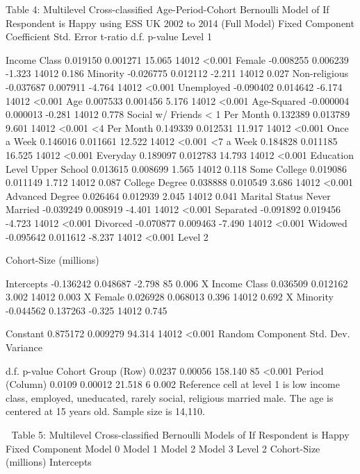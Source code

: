 

Table 4: Multilevel Cross-classified Age-Period-Cohort Bernoulli Model of If Respondent is Happy using ESS UK 2002 to 2014 (Full Model)
Fixed Component
Coefficient
Std. Error
t-ratio
d.f.
p-value
Level 1





Income Class
0.019150
0.001271
15.065
14012
<0.001
Female
-0.008255
0.006239
-1.323
14012
0.186
Minority
-0.026775
0.012112
-2.211
14012
0.027
Non-religious
-0.037687
0.007911
-4.764
14012
<0.001
Unemployed
-0.090402
0.014642
-6.174
14012
<0.001
Age
0.007533
0.001456
5.176
14012
<0.001
Age-Squared
-0.000004
0.000013
-0.281
14012
0.778
Social w/ Friends
< 1 Per Month
0.132389
0.013789
9.601
14012
<0.001
<4 Per Month
0.149339
0.012531
11.917
14012
<0.001
Once a Week
0.146016
0.011661
12.522
14012
<0.001
<7 a Week
0.184828
0.011185
16.525
14012
<0.001
Everyday
0.189097
0.012783
14.793
14012
<0.001
Education Level
Upper School
0.013615
0.008699
1.565
14012
0.118
Some College
0.019086
0.011149
1.712
14012
0.087
College Degree
0.038888
0.010549
3.686
14012
<0.001
Advanced Degree
0.026464
0.012939
2.045
14012
0.041
Marital Status
Never Married
-0.039249
0.008919
-4.401
14012
<0.001
Separated
-0.091892
0.019456
-4.723
14012
<0.001
Divorced
-0.070877
0.009463
-7.490
14012
<0.001
Widowed
-0.095642
0.011612
-8.237
14012
<0.001
Level 2





Cohort-Size (millions)





Intercepts
-0.136242
0.048687
-2.798
85
0.006
X Income Class
0.036509
0.012162
3.002
14012
0.003
X Female
0.026928
0.068013
0.396
14012
0.692
X Minority
-0.044562
0.137263
-0.325
14012
0.745






Constant
0.875172
0.009279
94.314
14012
<0.001
Random Component
Std. Dev.
Variance

d.f.
p-value
Cohort Group (Row)
0.0237
0.00056
158.140
85
<0.001
Period (Column)
0.0109
0.00012
21.518
6
0.002
Reference cell at level 1 is low income class, employed, uneducated, rarely social, religious married male. The age is centered at 15 years old. Sample size is 14,110.


Table 5: Multilevel Cross-classified Bernoulli Models of If Respondent is Happy
Fixed Component
Model 0
Model 1
Model 2
Model 3
Level 2 Cohort-Size (millions)
Intercepts


